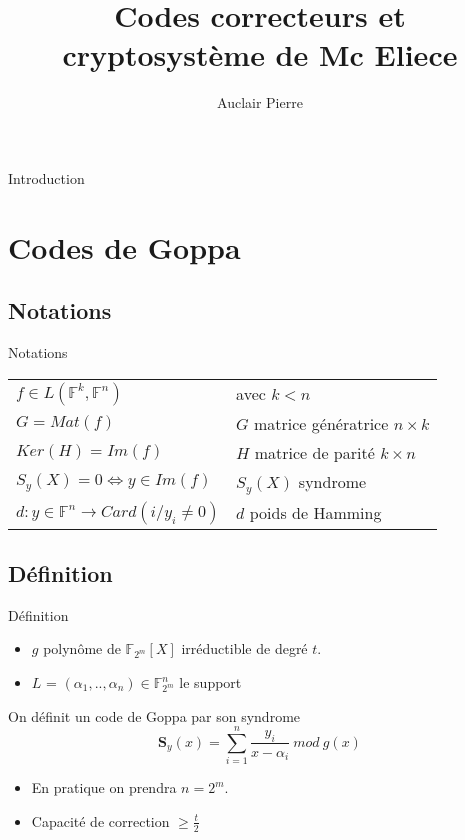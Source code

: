 \documentclass{beamer}
\title{Codes correcteurs et cryptosystème de Mc Eliece}
\author{Auclair Pierre}
\begin{document}
	\begin{frame}{Introduction}
		\tableofcontents
		
	\end{frame}

	\section{Codes de Goppa}

		\subsection{Notations}

			\begin{frame}{Notations}

				\begin{tabular}{ll}
					$f \in L(\mathbb{F}^{k},\mathbb{F}^{n})$ & avec $k < n$ \\
					$ G=Mat(f) $ & $G$ matrice génératrice $n\times k$\\
					$Ker(H) = Im(f)$ & $H$ matrice de parité $k\times n$\\
					$ S_{y}(X) = 0 \Leftrightarrow y \in Im(f) $ & $S_{y}(X)$ syndrome \\
					$ d : y \in \mathbb{F}^{n} \rightarrow Card( i / y_{i}\neq 0 ) $ & $d$ poids de Hamming
				\end{tabular}

			\end{frame}

		\subsection{Définition}

			\begin{frame}{Définition}

				\begin{itemize}
					\item $g$ polynôme de $ \mathbb{F}_{2^m}[X]$ irréductible de degré $t$.
					\item $L$ = $ (\alpha_{1},..,\alpha_{n})  \in \mathbb{F}_{2^{m}}^{n}$ le support
				\end{itemize}

				On définit un code de Goppa par son syndrome
				$$\mathbf{S}_{y}(x) = \sum_{i=1}^{n} \frac{y_{i}}{x-\alpha_{i}} \ mod \ g(x)$$
				\begin{itemize}
					\item En pratique on prendra $n = 2^{m}$.
					\item Capacité de correction $ \geq \frac{t}{2}$
				\end{itemize}

			\end{frame}
\end{document}
